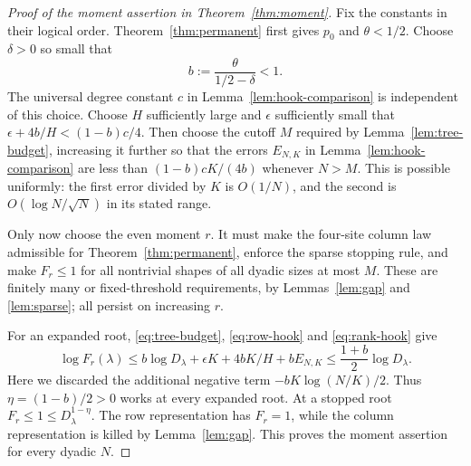\begin{proof}[Proof of the moment assertion in Theorem~\ref{thm:moment}]
Fix the constants in their logical order. Theorem~\ref{thm:permanent} first gives $p_0$ and $\theta<1/2$. Choose $\delta>0$ so small that
\[
 b:=\frac\theta{1/2-\delta}<1.
\]
The universal degree constant $c$ in Lemma~\ref{lem:hook-comparison} is independent of this choice. Choose $H$ sufficiently large and $\epsilon$ sufficiently small that
$\epsilon+4b/H<(1-b)c/4$. Then choose the cutoff $M$ required by Lemma~\ref{lem:tree-budget}, increasing it further so that the errors $E_{N,K}$ in Lemma~\ref{lem:hook-comparison} are less than $(1-b)cK/(4b)$ whenever $N>M$. This is possible uniformly: the first error divided by $K$ is $O(1/N)$, and the second is $O(\log N/\sqrt N)$ in its stated range.

Only now choose the even moment $r$. It must make the four-site column law admissible for Theorem~\ref{thm:permanent}, enforce the sparse stopping rule, and make $F_r\le1$ for all nontrivial shapes of all dyadic sizes at most $M$. These are finitely many or fixed-threshold requirements, by Lemmas~\ref{lem:gap} and \ref{lem:sparse}; all persist on increasing $r$.

For an expanded root, \eqref{eq:tree-budget}, \eqref{eq:row-hook} and \eqref{eq:rank-hook} give
\[
 \log F_r(\lambda)
 \le b\log D_\lambda+\epsilon K+4bK/H+bE_{N,K}
 \le\frac{1+b}{2}\log D_\lambda.
\]
Here we discarded the additional negative term
$-bK\log(N/K)/2$. Thus $\eta=(1-b)/2>0$ works at every expanded root. At a stopped root $F_r\le1\le D_\lambda^{1-\eta}$. The row representation has $F_r=1$, while the column representation is killed by Lemma~\ref{lem:gap}. This proves the moment assertion for every dyadic $N$.
\end{proof}
